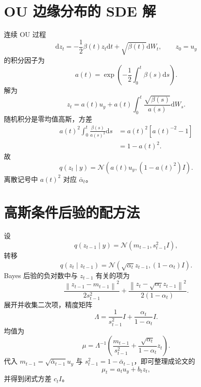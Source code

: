 \documentclass[UTF8,12pt,a4paper,fontset=none]{ctexart}
\numberwithin{equation}{section}
\newcommand{\norm}[1]{\left\lVert #1\right\rVert}
\newcommand{\dd}{\mathrm{d}}
\begin{document}
\section{OU 边缘分布的 SDE 解}
连续 OU 过程
\begin{equation}
 \dd z_t=-\frac12\beta(t)z_t\dd t+\sqrt{\beta(t)}\dd W_t,
 \qquad z_0=u_y
\end{equation}
的积分因子为
\begin{equation}
 a(t)=\exp\left(-\frac12\int_0^t\beta(s)\dd s\right).
\end{equation}
解为
\begin{equation}
 z_t=a(t)u_y+
 a(t)\int_0^t\frac{\sqrt{\beta(s)}}{a(s)}\dd W_s.
\end{equation}
随机积分是零均值高斯，方差
\begin{align}
 a(t)^2\int_0^t\frac{\beta(s)}{a(s)^2}\dd s
 &=a(t)^2[a(t)^{-2}-1]\\
 &=1-a(t)^2.
\end{align}
故
\begin{equation}
 \boxed{q(z_t\mid y)=\mathcal N(a(t)u_y,(1-a(t)^2)I).}
\end{equation}
离散记号中 $a(t)^2$ 对应 $\bar\alpha_t$。

\section{高斯条件后验的配方法}
设
\begin{equation}
 q(z_{t-1}\mid y)=\mathcal N(m_{t-1},s_{t-1}^2I),
\end{equation}
转移
\begin{equation}
 q(z_t\mid z_{t-1})=\mathcal N(\sqrt{\alpha_t}z_{t-1},(1-\alpha_t)I).
\end{equation}
Bayes 后验的负对数中与 $z_{t-1}$ 有关的项为
\begin{equation}
 \frac{\norm{z_{t-1}-m_{t-1}}^2}{2s_{t-1}^2}
 +\frac{\norm{z_t-\sqrt{\alpha_t}z_{t-1}}^2}{2(1-\alpha_t)}.
\end{equation}
展开并收集二次项，精度矩阵
\begin{equation}
 \Lambda=\frac1{s_{t-1}^2}I+\frac{\alpha_t}{1-\alpha_t}I.
\end{equation}
均值为
\begin{equation}
 \mu=\Lambda^{-1}
 \left(\frac{m_{t-1}}{s_{t-1}^2}
 +\frac{\sqrt{\alpha_t}}{1-\alpha_t}z_t\right).
\end{equation}
代入 $m_{t-1}=\sqrt{\bar\alpha_{t-1}}u_y$ 与 $s_{t-1}^2=1-\bar\alpha_{t-1}$，即可整理成论文的
\begin{equation}
 \mu_t=a_tu_y+b_tz_t,
\end{equation}
并得到闭式方差 $c_tI$。
\end{document}
